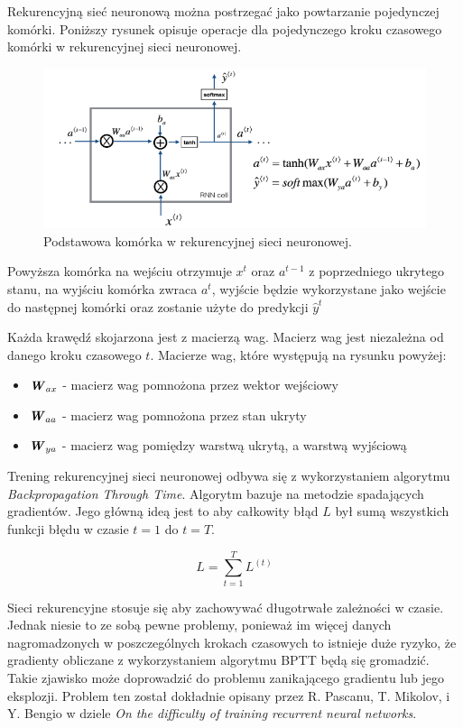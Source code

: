 	Rekurencyjną sieć neuronową można postrzegać jako powtarzanie pojedynczej komórki. Poniższy rysunek opisuje operacje dla pojedynczego kroku czasowego komórki w rekurencyjnej sieci neuronowej.
	
	\begin{figure}[H]
		\centering
		\includegraphics[width=0.7\linewidth]{rnn_cell}
		\caption{Podstawowa komórka w rekurencyjnej sieci neuronowej.}
		\label{fig:rnncell}
	\end{figure}

	 Powyższa komórka na wejściu otrzymuje $x^{t}$ oraz $a^{t-1}$ z poprzedniego ukrytego stanu, na wyjściu komórka zwraca $a^{t}$, wyjście będzie wykorzystane jako wejście do następnej komórki oraz zostanie użyte do predykcji $\hat{y}^{t}$

	Każda krawędź skojarzona jest z macierzą wag. Macierz wag jest niezależna od danego kroku czasowego $t$. Macierze wag, które występują na rysunku powyżej:
	
	\begin{itemize}
		\item $\textbf{\textit{W}}_{ax}$ - macierz wag pomnożona przez wektor wejściowy
		\item $\textbf{\textit{W}}_{aa}$ - macierz wag pomnożona przez stan ukryty
		\item $\textbf{\textit{W}}_{ya}$ - macierz wag pomiędzy warstwą ukrytą, a warstwą wyjściową
	\end{itemize} 
	
	Trening rekurencyjnej sieci neuronowej odbywa się z wykorzystaniem algorytmu \textit{Backpropagation Through Time}. Algorytm bazuje na metodzie spadających gradientów. Jego główną ideą jest to aby całkowity błąd $L$ był sumą wszystkich funkcji błędu w czasie $t=1$ do $t=T$.

	\begin{equation}
		L = \sum_{t=1}^{T} L^{(t)}
	\end{equation}

	Sieci rekurencyjne stosuje się aby zachowywać długotrwałe zależności w czasie. Jednak niesie to ze sobą pewne problemy, ponieważ im więcej danych nagromadzonych w poszczególnych krokach czasowych to istnieje duże ryzyko, że gradienty obliczane z wykorzystaniem algorytmu BPTT będą się gromadzić. Takie zjawisko może doprowadzić do problemu zanikającego gradientu lub jego eksplozji. Problem ten został dokładnie opisany przez R. Pascanu, T. Mikolov, i Y. Bengio w dziele \textit{On the difficulty of training recurrent neural networks}.
	
